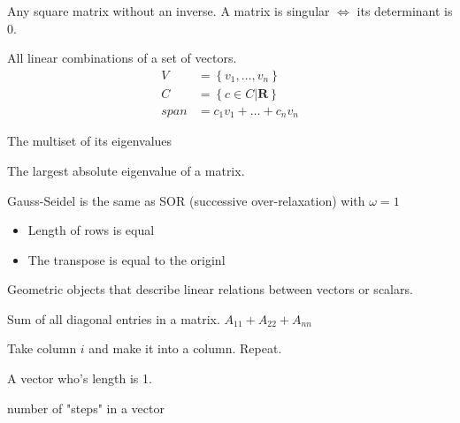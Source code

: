 \begin{definition}
    Any square matrix without an inverse.
    A matrix is singular $\iff$ its determinant is 0.

\end{definition}

\begin{definition}\label{vectorspan}
    All linear combinations of a set of vectors.
    \begin{align*}
        V &= \left\{v_{1}, \dots, v_n\right\} \\
        C &= \left\{c \in C | \mathbf{R}\right\} \\
        span &= c_{1}v_{1} + \dots + c_{n}v_{n}
    \end{align*}
\end{definition}

\begin{definition}
    The multiset of its eigenvalues
\end{definition}

\begin{definition}
    The largest absolute eigenvalue of a matrix.
\end{definition}

\begin{definition}
    Gauss-Seidel is the same as SOR (successive over-relaxation) with $\omega=1$
\end{definition}

\begin{definition}[Symmetric]
    \begin{itemize}
        \item Length of rows is equal
        \item The transpose is equal to the originl
    \end{itemize}
\end{definition}

\begin{definition}[Tensor]
    Geometric objects that describe linear relations between vectors or scalars.
\end{definition}

\begin{definition}[Trace]
    Sum of all diagonal entries in a matrix.
    $A_{11} + A_{22} + A_{nn}$
\end{definition}

\begin{definition}[Transpose]
    Take column $i$ and make it into a column. Repeat.
\end{definition}

\begin{definition}
    A vector who's length is 1.
\end{definition}


\begin{definition}
    number of "steps" in a vector
\end{definition}


